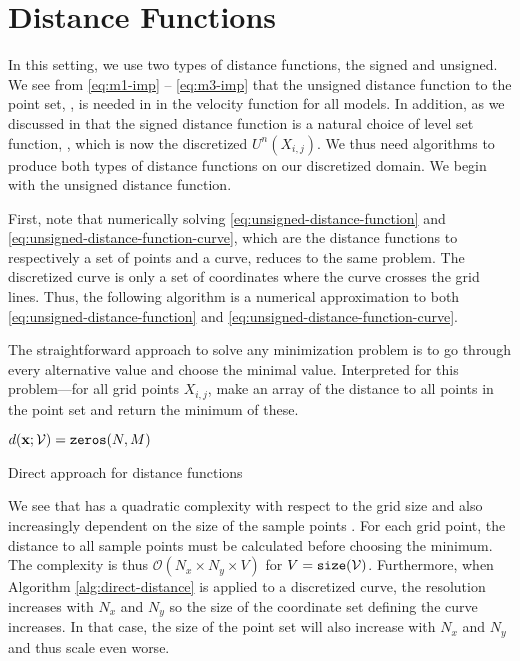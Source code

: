 \section{Distance Functions} \label{sec:imp-dist}
In this setting, we use two types of distance functions, the signed and unsigned. We see from \eqref{eq:m1-imp} -- \eqref{eq:m3-imp} that the unsigned distance function to the point set, \pointset, is needed in in the velocity function for all models. In addition, as we discussed in  that the signed distance function is a natural choice of level set function, \uxt, which is now the discretized $U^n(X_{i, j})$. We thus need algorithms to produce both types of distance functions on our discretized domain. We begin with the unsigned distance function.

First, note that numerically solving \eqref{eq:unsigned-distance-function} and \eqref{eq:unsigned-distance-function-curve}, which are the distance functions to respectively a set of points and a curve, reduces to the same problem. The discretized curve is only a set of coordinates where the curve crosses the grid lines. Thus, the following algorithm is a numerical approximation to both \eqref{eq:unsigned-distance-function} and \eqref{eq:unsigned-distance-function-curve}.

The straightforward approach to solve any minimization problem is to go through every alternative value and choose the minimal value. Interpreted for this problem---for all grid points $X_{i, j}$, make an array of the distance to all points in the point set and return the minimum of these.

\begin{algorithm}[H]
\SetAlgoLined
$d(\mathbf{x}; \mathcal{V})=\texttt{zeros}(N,M)$\;

 \caption{Direct approach for distance functions}
 \label{alg:direct-distance}
\end{algorithm}

We see that  has a quadratic complexity with respect to the grid size and also increasingly dependent on the size of the sample points \pointset. For each grid point, the distance to all sample points must be calculated before choosing the minimum. The complexity is thus $\mathcal{O}(N_x\times N_y \times V)$ for $V=\texttt{size}(\mathcal{V})$. Furthermore, when Algorithm \ref{alg:direct-distance} is applied to a discretized curve, the resolution increases with $N_x$ and $N_y$ so the size of the coordinate set defining the curve increases. In that case, the size of the point set will also increase with $N_x$ and $N_y$ and thus scale even worse.

